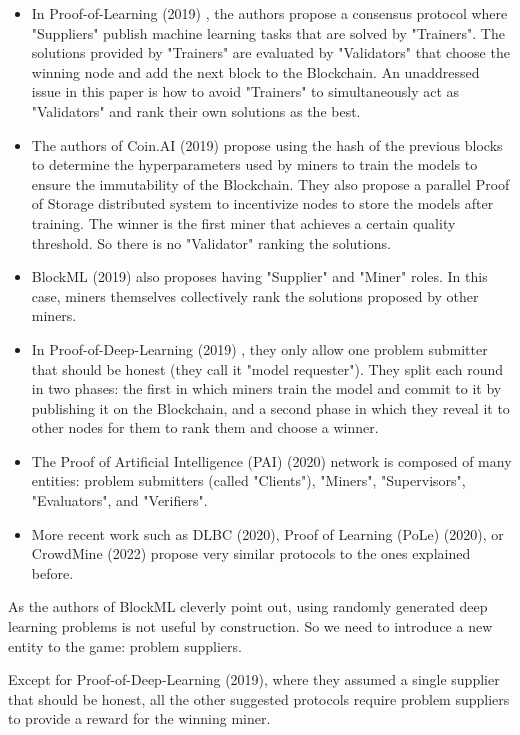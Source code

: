 \documentclass[conference]{IEEEtran}
\begin{document}
\begin{itemize}
\item In Proof-of-Learning (2019) \cite{}, the authors propose a consensus protocol where "Suppliers" publish machine learning tasks that are solved by "Trainers". The solutions provided by "Trainers" are evaluated by "Validators" that choose the winning node and add the next block to the Blockchain. An unaddressed issue in this paper is how to avoid "Trainers" to simultaneously act as "Validators" and rank their own solutions as the best.
\item The authors of Coin.AI (2019) \cite{} propose using the hash of the previous blocks to determine the hyperparameters used by miners to train the models to ensure the immutability of the Blockchain. They also propose a parallel Proof of Storage distributed system to incentivize nodes to store the models after training. The winner is the first miner that achieves a certain quality threshold. So there is no "Validator" ranking the solutions.
\item BlockML (2019) \cite{} also proposes having "Supplier" and "Miner" roles. In this case, miners themselves collectively rank the solutions proposed by other miners.
\item In Proof-of-Deep-Learning (2019) \cite{}, they only allow one problem submitter that should be honest (they call it "model requester"). They split each round in two phases: the first in which miners train the model and commit to it by publishing it on the Blockchain, and a second phase in which they reveal it to other nodes for them to rank them and choose a winner.
\item The Proof of Artificial Intelligence (PAI) (2020) \cite{} network is composed of many entities: problem submitters (called "Clients"), "Miners", "Supervisors", "Evaluators", and "Verifiers".
\item More recent work such as DLBC (2020)\cite{}, Proof of Learning (PoLe) (2020)\cite{}, or CrowdMine (2022)\cite{} propose very similar protocols to the ones explained before.

\end{itemize}

As the authors of BlockML cleverly point out, using randomly generated deep learning problems is not useful by construction. So we need to introduce a new entity to the game: problem suppliers.

Except for Proof-of-Deep-Learning (2019), where they assumed a single supplier that should be honest, all the other suggested protocols require problem suppliers to provide a reward for the winning miner.
\end{document}
